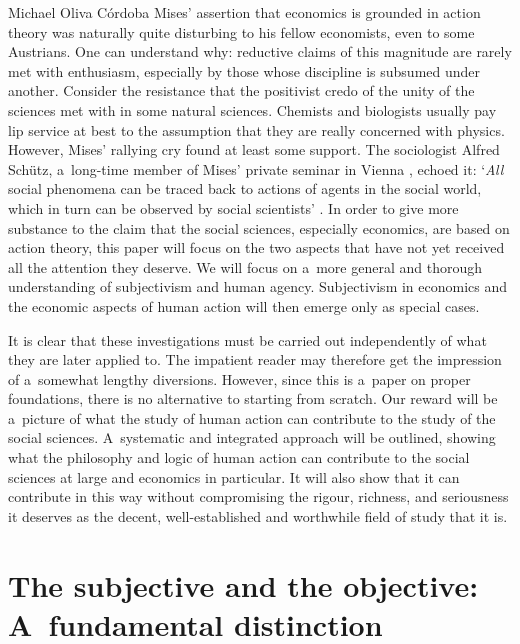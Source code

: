\begin{artengenv}{Michael Oliva Córdoba}
Mises' assertion that economics is grounded in action theory was naturally quite disturbing to his fellow economists, even to some Austrians. One can understand why: reductive claims of this magnitude are rarely met with enthusiasm, especially by those whose discipline is subsumed under another. Consider the resistance that the positivist credo of the unity of the sciences met with in some natural sciences. Chemists and biologists usually pay lip service at best to the assumption that they are really concerned with physics. However, Mises' rallying cry found at least some support. The sociologist Alfred Schütz, a~long-time member of Mises' private seminar in Vienna 
\parencite[][p.5ff]{prendergast_alfred_1986}, %
 echoed it: ‘\textit{All} social phenomena can be traced back to actions of agents in the social world, which in turn can be observed by social scientists' 
\parencites[][p.96]{schutz_political_1996}[cf.][p.26]{schutz_common-sense_1953}[][p.122]{kurrild-klitgaard_rationality_2001}. %
 In order to give more substance to the claim that the social sciences, especially economics, are based on action theory, this paper will focus on the two aspects that have not yet received all the attention they deserve. We will focus on a~more general and thorough understanding of subjectivism and human agency. Subjectivism in economics and the economic aspects of human action will then emerge only as special cases.



It is clear that these investigations must be carried out independently of what they are later applied to. The impatient reader may therefore get the impression of a~somewhat lengthy diversions. However, since this is a~paper on proper foundations, there is no alternative to starting from scratch. Our reward will be a~picture of what the study of human action can contribute to the study of the social sciences. A~systematic and integrated approach will be outlined, showing what the philosophy and logic of human action can contribute to the social sciences at large and economics in particular. It will also show that it can contribute in this way without compromising the rigour, richness, and seriousness it deserves as the decent, well-established and worthwhile field of study that it is.



\section[The subjective and the objective: A~fundamental distinction]{The subjective and the objective: A~fundamental distinction\footnotemark}


\end{artengenv}
